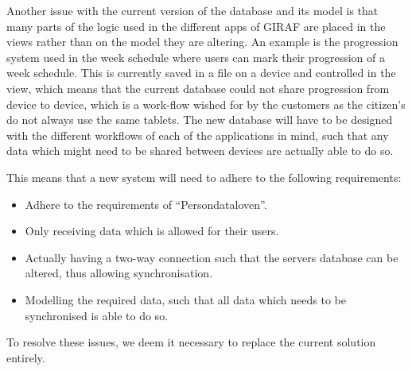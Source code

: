 Another issue with the current version of the database and its model is that many parts of the logic used in the different apps of GIRAF are placed in the views rather than on the model they are altering.
An example is the progression system used in the week schedule where users can mark their progression of a week schedule.
This is currently saved in a file on a device and controlled in the view, which means that the current database could not share progression from device to device, which is a work-flow wished for by the customers as the citizen's do not always use the same tablets.
The new database will have to be designed with the different workflows of each of the applications in mind, such that any data which might need to be shared between devices are actually able to do so.

This means that a new system will need to adhere to the following requirements:
\begin{itemize}
	\item Adhere to the requirements of ``Persondataloven''.
	\item Only receiving data which is allowed for their users.
	\item Actually having a two-way connection such that the servers database can be altered, thus allowing synchronisation.
	\item Modelling the required data, such that all data which needs to be synchronised is able to do so.
\end{itemize}

To resolve these issues, we deem it necessary to replace the current solution entirely.
